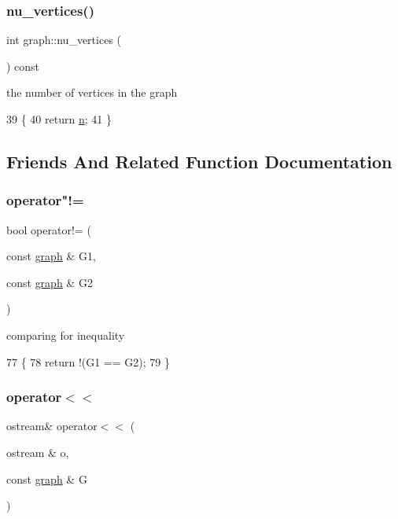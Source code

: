 \subsubsection{\texorpdfstring{nu\+\_\+vertices()}{nu\_vertices()}}
{\footnotesize\ttfamily int graph\+::nu\+\_\+vertices (\begin{DoxyParamCaption}{ }\end{DoxyParamCaption}) const}



the number of vertices in the graph 


\begin{DoxyCode}
39                             \{
40   \textcolor{keywordflow}{return} \hyperlink{classgraph_ac8b3474ce95c04087c312508ec1443b6}{n};
41 \}
\end{DoxyCode}


\subsection{Friends And Related Function Documentation}
\mbox{\label{classgraph_a004e2b491d4bafaf2d8129e6bc8abc2e}} 
\subsubsection{\texorpdfstring{operator"!=}{operator!=}}
{\footnotesize\ttfamily bool operator!= (\begin{DoxyParamCaption}\item[{const \hyperlink{classgraph}{graph} \&}]{G1,  }\item[{const \hyperlink{classgraph}{graph} \&}]{G2 }\end{DoxyParamCaption})\hspace{0.3cm}{\ttfamily [friend]}}



comparing for inequality 


\begin{DoxyCode}
77 \{
78   \textcolor{keywordflow}{return} !(G1 == G2);
79 \}
\end{DoxyCode}
\mbox{\label{classgraph_abe8832440fa24b6a6c152dbc3736c908}} 
\subsubsection{\texorpdfstring{operator$<$$<$}{operator<<}}
{\footnotesize\ttfamily ostream\& operator$<$$<$ (\begin{DoxyParamCaption}\item[{ostream \&}]{o,  }\item[{const \hyperlink{classgraph}{graph} \&}]{G }\end{DoxyParamCaption})\hspace{0.3cm}{\ttfamily [friend]}}




